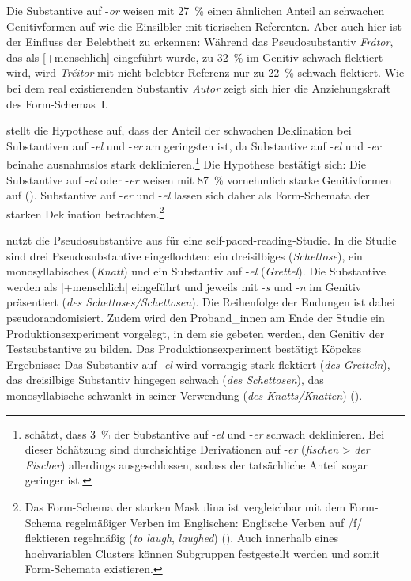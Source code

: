 Die Substantive auf -\textit{or} weisen mit 27~\% einen ähnlichen Anteil an schwachen Genitivformen auf wie die Einsilbler mit tierischen Referenten. Aber auch hier ist der Einfluss der Belebtheit zu erkennen: Während das Pseudosubstantiv \textit{Frátor}, das als [+menschlich] eingeführt wurde, zu 32~\% im Genitiv schwach flektiert wird, wird \textit{Tréitor} mit nicht-belebter Referenz nur zu 22~\% schwach flektiert. Wie bei dem real existierenden Substantiv \textit{Autor} zeigt sich hier die Anziehungskraft des Form-Schemas~I. 



\textcite[159--161]{Kopcke.2000b} stellt die Hypothese auf, dass der Anteil der schwachen Deklination bei Substantiven auf -\textit{el} und -\textit{er} am geringsten ist, da Substantive auf -\textit{el} und -\textit{er} beinahe ausnahmslos stark deklinieren.\footnote{\textcite[160--161]{Kopcke.2000b} schätzt, dass 3~\% der Substantive auf -\textit{el} und -\textit{er} schwach deklinieren. Bei dieser Schätzung sind durchsichtige Derivationen auf -\textit{er} (\textit{fischen} > \textit{der Fischer}) allerdings ausgeschlossen, sodass der tatsächliche Anteil sogar geringer ist.}  Die Hypothese bestätigt sich: Die Substantive auf -\textit{el} oder -\textit{er} weisen mit 87~\% vornehmlich starke Genitivformen auf (\cite[161]{Kopcke.2000b}). Substantive auf -\textit{er} und -\textit{el} lassen sich daher als Form-Schemata der starken Deklination betrachten.\footnote{Das Form-Schema der starken Maskulina ist vergleichbar mit dem Form-Schema regelmäßiger Verben im Englischen: Englische Verben auf /f/ flektieren regelmäßig (\textit{to laugh}, \textit{laughed}) (\cite[135]{Goldberg.2019}). Auch innerhalb eines hochvariablen Clusters können Subgruppen festgestellt werden und somit Form-Schemata existieren.}\largerpage

\textcite{Schmitt.2019} nutzt die Pseudosubstantive aus \textcite{Kopcke.2000b} für eine self-paced-reading-Studie. In die Studie sind drei Pseudosubstantive eingeflochten: ein dreisilbiges (\textit{Schettose}), ein monosyllabisches (\textit{Knatt}) und ein Substantiv auf -\textit{el} (\textit{Grettel}). Die Substantive werden als [+menschlich] eingeführt und jeweils mit -\textit{s} und -\textit{n} im Genitiv präsentiert (\textit{des Schettoses/Schettosen}). Die Reihenfolge der Endungen ist dabei pseudorandomisiert. Zudem wird den Proband\_innen am Ende der Studie ein Produktionsexperiment vorgelegt, in dem sie gebeten werden, den Genitiv der Testsubstantive zu bilden. Das Produktionsexperiment bestätigt Köpckes Ergebnisse: Das Substantiv auf -\textit{el} wird vorrangig stark flektiert (\textit{des Gretteln}), das dreisilbige Substantiv hingegen schwach (\textit{des Schettosen}), das monosyllabische schwankt in seiner Verwendung (\textit{des Knatts/Knatten}) (\cite[167--169]{Schmitt.2019}).   



